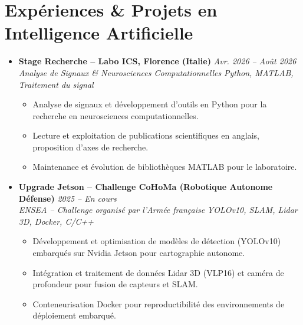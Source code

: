 \documentclass[a4paper,11pt]{article}
\begin{document}
\section{Expériences \& Projets en Intelligence Artificielle}
\begin{itemize}[leftmargin=*, label={-}]

\item \textbf{Stage Recherche -- Labo ICS, Florence (Italie)} \hfill \textit{Avr. 2026 -- Août 2026} \\
\textit{Analyse de Signaux \& Neurosciences Computationnelles} \hfill \textit{Python, MATLAB, Traitement du signal}
\vspace{-2pt}
    \begin{itemize}[leftmargin=0.4cm, nosep, label=\tiny$\bullet$]
        \item \small{Analyse de signaux et développement d'outils en Python pour la recherche en neurosciences computationnelles.}
        \item \small{Lecture et exploitation de publications scientifiques en anglais, proposition d'axes de recherche.}
        \item \small{Maintenance et évolution de bibliothèques MATLAB pour le laboratoire.}
    \end{itemize}
\vspace{3pt}

\item \textbf{Upgrade Jetson -- Challenge CoHoMa (Robotique Autonome Défense)} \hfill \textit{2025 -- En cours} \\
\textit{ENSEA -- Challenge organisé par l'Armée française} \hfill \textit{YOLOv10, SLAM, Lidar 3D, Docker, C/C++}
\vspace{-2pt}
    \begin{itemize}[leftmargin=0.4cm, nosep, label=\tiny$\bullet$]
        \item \small{Développement et optimisation de modèles de détection (YOLOv10) embarqués sur Nvidia Jetson pour cartographie autonome.}
        \item \small{Intégration et traitement de données Lidar 3D (VLP16) et caméra de profondeur pour fusion de capteurs et SLAM.}
        \item \small{Conteneurisation Docker pour reproductibilité des environnements de déploiement embarqué.}
    \end{itemize}
\vspace{3pt}


\end{itemize}
\end{document}
